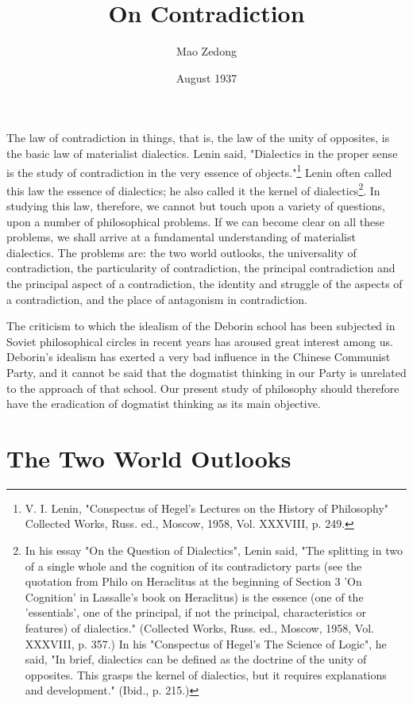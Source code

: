 \documentclass{article}
\begin{document}
\title{On Contradiction}
\author{Mao Zedong}
\date{August 1937}

\maketitle

The law of contradiction in things, that is, the law of the unity of
opposites, is the basic law of materialist dialectics. Lenin said,
"Dialectics in the proper sense is the study of contradiction in the very
essence of objects."\footnote{V. I. Lenin, "Conspectus of Hegel's Lectures
on the History of Philosophy" Collected Works, Russ. ed., Moscow, 1958,
Vol. XXXVIII, p. 249.} Lenin often called this law the essence of
dialectics; he also called it the kernel of dialectics\footnote{In
his essay "On the Question of Dialectics", Lenin said, "The splitting in
two of a single whole and the cognition of its contradictory parts (see
the quotation from Philo on Heraclitus at the beginning of Section 3 'On
Cognition' in Lassalle's book on Heraclitus) is the essence (one of the
'essentials', one of the principal, if not the principal, characteristics
or features) of dialectics." (Collected Works, Russ. ed., Moscow, 1958,
Vol. XXXVIII, p. 357.) In his "Conspectus of Hegel's The Science of
Logic", he said, "In brief, dialectics can be defined as the doctrine of
the unity of opposites. This grasps the kernel of dialectics, but it
requires explanations and development." (Ibid., p. 215.)}. In studying this
law, therefore, we cannot but touch upon a variety of questions, upon
a number of philosophical problems. If we can become clear on all these
problems, we shall arrive at a fundamental understanding of materialist
dialectics. The problems are: the two world outlooks, the universality of
contradiction, the particularity of contradiction, the principal
contradiction and the principal aspect of a contradiction, the identity
and struggle of the aspects of a contradiction, and the place of
antagonism in contradiction.

The criticism to which the idealism of the Deborin school has been
subjected in Soviet philosophical circles in recent years has aroused
great interest among us. Deborin's idealism has exerted a very bad
influence in the Chinese Communist Party, and it cannot be said that the
dogmatist thinking in our Party is unrelated to the approach of that
school. Our present study of philosophy should therefore have the
eradication of dogmatist thinking as its main objective.

\section{The Two World Outlooks}
\end{document}
